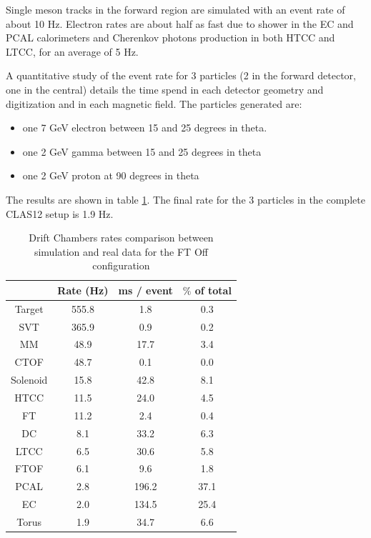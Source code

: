 Single meson tracks in the forward region are simulated with an event rate of about 10 Hz.
Electron rates are about half as fast due to shower in the EC and PCAL calorimeters and
Cherenkov photons production in both HTCC and LTCC, for an average of 5 Hz.

A quantitative study of the event rate for 3 particles (2 in the forward detector, one in the central)
details the time spend in each detector geometry and digitization and in each magnetic field.
The particles generated are:

\begin{itemize}
	\item one 7 GeV electron between 15 and 25 degrees in theta.
	\item one 2 GeV gamma between 15 and 25 degrees in theta
	\item one 2 GeV proton at 90 degrees in theta
\end{itemize}

The results are shown in table \ref{tab:benchmarks}. The final rate for the 3 particles in the
complete CLAS12 setup is 1.9 Hz.

\begin{table}[h]
	\begin{center}
		\begin{tabular}{ c | c | c | c }
			 & Rate (Hz) &  ms / event &  $\%$ of total\\
			\hline
Target   &  555.8  &   1.8   & 0.3  \\
SVT      &  365.9  &   0.9   & 0.2  \\
MM       &  48.9   &   17.7  & 3.4  \\
CTOF     &  48.7   &   0.1   & 0.0  \\
Solenoid &  15.8   &   42.8  & 8.1  \\
HTCC     &  11.5   &   24.0  & 4.5  \\
FT       &  11.2   &   2.4   & 0.4  \\
DC       &  8.1    &   33.2  & 6.3  \\
LTCC     &  6.5    &   30.6  & 5.8  \\
FTOF     &  6.1    &   9.6   & 1.8  \\
PCAL     &  2.8    &   196.2 & 37.1 \\
EC       &  2.0    &   134.5 & 25.4 \\
Torus    &  1.9    &   34.7  & 6.6  \\
		\end{tabular}
	\end{center}
	\caption{Drift Chambers rates comparison between simulation and real data for the FT Off configuration}\label{tab:benchmarks}
\end{table}

